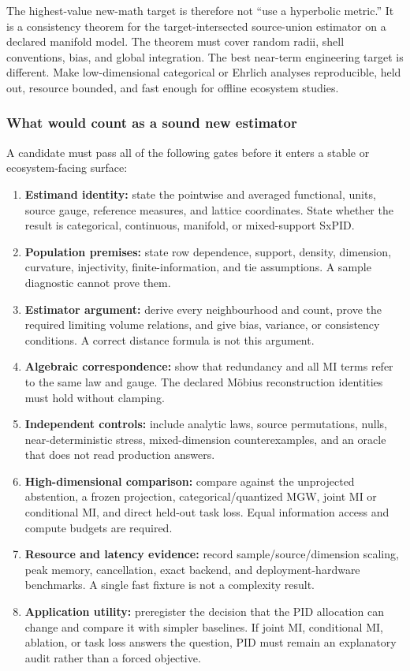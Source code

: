 \documentclass[
  11pt,
  a4paper,
]{article}
\providecommand{\tightlist}{%
  \setlength{\itemsep}{0pt}\setlength{\parskip}{0pt}}
\begin{document}
The highest-value new-math target is therefore not ``use a hyperbolic
metric.'' It is a consistency theorem for the target-intersected
source-union estimator on a declared manifold model. The theorem must
cover random radii, shell conventions, bias, and global integration. The
best near-term engineering target is different. Make low-dimensional
categorical or Ehrlich analyses reproducible, held out, resource
bounded, and fast enough for offline ecosystem studies.

\subsubsection{What would count as a sound new
estimator}\label{what-would-count-as-a-sound-new-estimator}

A candidate must pass all of the following gates before it enters a
stable or ecosystem-facing surface:

\begin{enumerate}
\def\labelenumi{\arabic{enumi}.}
\tightlist
\item
  \textbf{Estimand identity:} state the pointwise and averaged
  functional, units, source gauge, reference measures, and lattice
  coordinates. State whether the result is categorical, continuous,
  manifold, or mixed-support SxPID.
\item
  \textbf{Population premises:} state row dependence, support, density,
  dimension, curvature, injectivity, finite-information, and tie
  assumptions. A sample diagnostic cannot prove them.
\item
  \textbf{Estimator argument:} derive every neighbourhood and count,
  prove the required limiting volume relations, and give bias, variance,
  or consistency conditions. A correct distance formula is not this
  argument.
\item
  \textbf{Algebraic correspondence:} show that redundancy and all MI
  terms refer to the same law and gauge. The declared Möbius
  reconstruction identities must hold without clamping.
\item
  \textbf{Independent controls:} include analytic laws, source
  permutations, nulls, near-deterministic stress, mixed-dimension
  counterexamples, and an oracle that does not read production answers.
\item
  \textbf{High-dimensional comparison:} compare against the unprojected
  abstention, a frozen projection, categorical/quantized MGW, joint MI
  or conditional MI, and direct held-out task loss. Equal information
  access and compute budgets are required.
\item
  \textbf{Resource and latency evidence:} record sample/source/dimension
  scaling, peak memory, cancellation, exact backend, and
  deployment-hardware benchmarks. A single fast fixture is not a
  complexity result.
\item
  \textbf{Application utility:} preregister the decision that the PID
  allocation can change and compare it with simpler baselines. If joint
  MI, conditional MI, ablation, or task loss answers the question, PID
  must remain an explanatory audit rather than a forced objective.
\end{enumerate}
\end{document}
